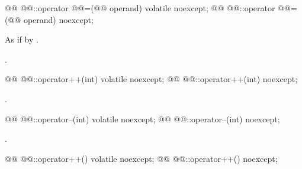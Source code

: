 %
%
%
%
%
%
%
\begin{itemdecl}
@@ @@::operator @@=(@@ operand) volatile noexcept;
@@ @@::operator @@=(@@ operand) noexcept;
\end{itemdecl}

\begin{itemdescr}
\pnum
\effects As if by .

\pnum
\returns {}.
\end{itemdescr}

%
%
\begin{itemdecl}
@@ @@::operator++(int) volatile noexcept;
@@ @@::operator++(int) noexcept;
\end{itemdecl}

\begin{itemdescr}
\pnum
\returns {}.
\end{itemdescr}

%
%
\begin{itemdecl}
@@ @@::operator--(int) volatile noexcept;
@@ @@::operator--(int) noexcept;
\end{itemdecl}

\begin{itemdescr}
\pnum
\returns {}.
\end{itemdescr}

%
%
\begin{itemdecl}
@@ @@::operator++() volatile noexcept;
@@ @@::operator++() noexcept;
\end{itemdecl}


